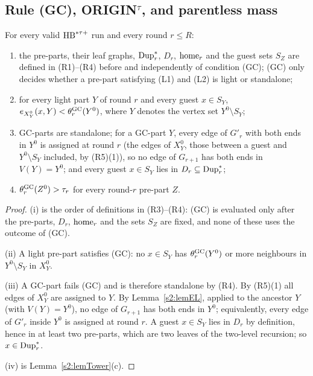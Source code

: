 \subsection{Rule (GC), ORIGIN\texorpdfstring{$^\tau$}{-tau}, and parentless mass}

\begin{lemma}[rule GC]\label{s2:lemGC}
For every valid $\mathrm{HB}^{*\tau{+}}$ run and every round $r\le R$:
\begin{enumerate}
\item[(i)] the pre-parts, their leaf graphs, $\mathrm{Dup}^{*}_r$, $D_r$, $\mathrm{home}_r$ and
the guest sets $S_Z$ are defined in (R1)--(R4) before and independently of
condition (GC); (GC) only decides whether a pre-part satisfying (L1) and (L2)
is light or standalone;
\item[(ii)] for every light part $Y$ of round $r$ and every guest $x\in S_Y$,
$e_{X^0_Y}(x,Y)<\theta^{\mathrm{GC}}_r(Y^0)$, where $Y$ denotes the vertex set
$Y^0\setminus S_Y$;
\item[(iii)] GC-parts are standalone; for a GC-part $Y$, every edge of $G'_r$
with both ends in $Y^0$ is assigned at round $r$ (the edges of $X^0_Y$, those
between a guest and $Y^0\setminus S_Y$ included, by (R5)(1)), so no edge of
$G_{r+1}$ has both ends in $V(Y)=Y^0$; and every guest $x\in S_Y$ lies in
$D_r\subseteq\mathrm{Dup}^{*}_r$;
\item[(iv)] $\theta^{\mathrm{GC}}_r(Z^0)>\tau_r$ for every round-$r$ pre-part $Z$.
\end{enumerate}
\deps{\ref{s2:defHBtp}, \ref{s2:lemTower}, \ref{s2:lemEL}, \ref{s2:defAncestors}}
\end{lemma}

\begin{proof}
(i) is the order of definitions in (R3)--(R4): (GC) is evaluated only after
the pre-parts, $D_r$, $\mathrm{home}_r$ and the sets $S_Z$ are fixed, and none of
these uses the outcome of (GC).

(ii) A light pre-part satisfies (GC): no $x\in S_Y$ has $\theta^{\mathrm{GC}}_r(Y^0)$ or more
neighbours in $Y^0\setminus S_Y$ in $X^0_Y$.

(iii) A GC-part fails (GC) and is therefore standalone by (R4). By (R5)(1) all
edges of $X^0_Y$ are assigned to $Y$. By Lemma~\ref{s2:lemEL}, applied to the
ancestor $Y$ (with $V(Y)=Y^0$), no edge of $G_{r+1}$ has both ends in $Y^0$;
equivalently, every edge of $G'_r$ inside $Y^0$ is assigned at round $r$. A
guest $x\in S_Y$ lies in $D_r$ by definition, hence in at least two pre-parts,
which are two leaves of the two-level recursion; so $x\in\mathrm{Dup}^{*}_r$.

(iv) is Lemma~\ref{s2:lemTower}(c).
\end{proof}


